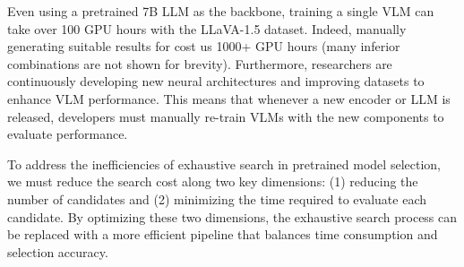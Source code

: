 
Even using a pretrained 7B LLM as the backbone, training a single VLM can take over 100 GPU hours with the LLaVA-1.5 dataset. 
Indeed, manually generating suitable results for  cost us 1000+ GPU hours (many inferior combinations are not shown for brevity).
Furthermore, researchers are continuously developing new neural architectures and improving datasets to enhance VLM performance. 
This means that whenever a new encoder or LLM is released, developers must manually re-train VLMs with the new components to evaluate performance.

To address the inefficiencies of exhaustive search in pretrained model selection, we must reduce the search cost along two key dimensions: 
(1) reducing the number of candidates and 
(2) minimizing the time required to evaluate each candidate. 
By optimizing these two dimensions, the exhaustive search process can be replaced with a more efficient pipeline that balances time consumption and selection accuracy.


